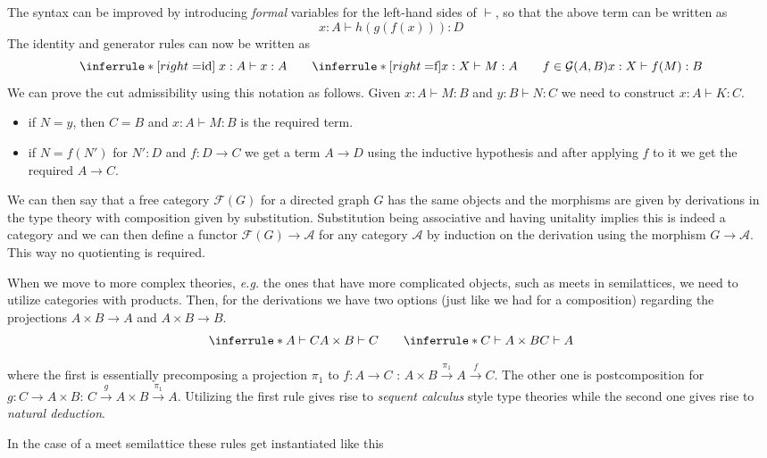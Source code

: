 \documentclass[acmsmall,screen, nonacm, anonymous]{acmart}
\begin{document}
\begin{example}
The syntax can be improved by introducing \textit{formal} variables for the left-hand sides of $\vdash$, so that the above term can be written as
\[
x : A \vdash h(g(f(x))) : D
\]
The identity and generator rules can now be written as
\[
\inferrule*[right=$id$]{\;}{x : A \vdash x : A} \qquad \inferrule*[right=$f$]{x : X \vdash M : A \hspace{2em} f \in \mathcal{G}(A,B)}{x : X \vdash f(M) : B}
\]
We can prove the cut admissibility using this notation as follows.
Given $x : A \vdash M : B$ and $y : B \vdash N : C$ we need to construct $x : A \vdash K : C$.
\begin{itemize}
  \item if $N = y$, then $C = B$ and $x : A \vdash M : B$ is the required term.
  \item if $N = f(N')$ for $N' : D$ and $f : D \to C$ we get a term $A \to D$ using the inductive hypothesis and after applying $f$ to it we get the required $A \to C$.
\end{itemize}

We can then say that a free category $\mathcal{F}(G)$ for a directed graph $G$ has the same objects and the morphisms are given by derivations in the type theory with composition given by substitution.
Substitution being associative and having unitality implies this is indeed a category and we can then define a functor $\mathcal{F}(G) \to \mathcal{A}$ for any category $\mathcal{A}$ by induction on the derivation using the morphism $G \to \mathcal{A}$.
This way no quotienting is required.
\end{example}

When we move to more complex theories, \textit{e.g.} the ones that have more complicated objects, such as meets in semilattices, we need to utilize categories with products.
Then, for the derivations we have two options (just like we had for a composition) regarding the projections $A \times B \to A$ and $A \times B \to B$.
\[
\inferrule*{A \vdash C}{A \times B \vdash C} \qquad \inferrule*{C \vdash A \times B}{C \vdash A}
\]

where the first is essentially precomposing a projection $\pi_1$ to $f: A \to C$ : $A \times B \xrightarrow{\pi_1} A \xrightarrow{f} C$.
The other one is postcomposition for $g : C \to A \times B$: $C \xrightarrow{g} A \times B \xrightarrow{\pi_1} A$.
Utilizing the first rule gives rise to \textit{sequent calculus} style type theories while the second one gives rise to \textit{natural deduction}.

In the case of a meet semilattice these rules get instantiated like this
\end{document}
